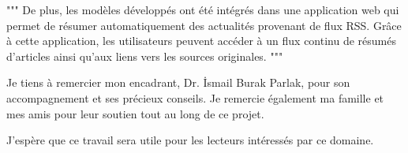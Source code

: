 """ De plus, les modèles développés ont été intégrés dans une application web qui permet de résumer automatiquement des actualités provenant de flux RSS. Grâce à cette application, les utilisateurs peuvent accéder à un flux continu de résumés d’articles ainsi qu’aux liens vers les sources originales. """

Je tiens à remercier mon encadrant, Dr. İsmail Burak Parlak, pour son accompagnement et ses précieux conseils. Je remercie également ma famille et mes amis pour leur soutien tout au long de ce projet.

J’espère que ce travail sera utile pour les lecteurs intéressés par ce domaine.